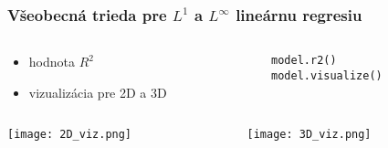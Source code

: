 \documentclass[presentation.tex]{subfiles}
\begin{document}
    \begin{frame}[fragile]
        \frametitle{Všeobecná trieda pre $L^1$ a $L^{\infty}$ lineárnu regresiu}
        \begin{columns}
        	\begin{column}{0.5\textwidth}
        		\begin{itemize}
        			\item hodnota $R^2$
        			\item vizualizácia pre 2D a 3D
        		\end{itemize}
        	\end{column}
        	\begin{column}{0.5\textwidth}
        		\vspace{0.4cm}
        		\begin{lstlisting}            	
model.r2()
model.visualize()
        		\end{lstlisting}
        	\end{column}
        \end{columns}

        \begin{columns}
            \begin{column}{0.5\textwidth}
            	\centering
                \texttt{[image: 2D\_viz.png]}
            \end{column}
            \begin{column}{0.5\textwidth}
            	\centering
                \texttt{[image: 3D\_viz.png]}
            \end{column}
        \end{columns}
    \end{frame}
\end{document}
